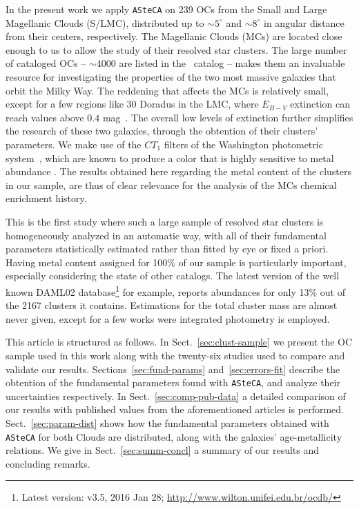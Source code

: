\documentclass{aa}
\begin{document}
In the present work we apply \texttt{ASteCA} on 239 OCs from the Small and Large
Magellanic Clouds (S/LMC), distributed up to ${\sim}5^{\circ}$ and ${\sim}8^
{\circ}$ in angular distance from their centers, respectively.
%
The Magellanic Clouds (MCs) are located close enough to us to allow the study of
their resolved star clusters. The large number of cataloged
OCs -- $\sim4000$ are listed in the~\cite{Bica_2008} catalog -- makes them an
invaluable resource for investigating the properties of the two most massive
galaxies that orbit the Milky Way.
%
The reddening that affects the MCs is relatively small,
except for a few regions like 30 Doradus in the LMC, where $E_{B-V}$
extinction can reach values above $0.4$ mag~\citep{Piatti_2015b}.
The overall low levels of extinction further simplifies the research of these
two galaxies, through the obtention of their clusters' parameters.
%
We make use of the $CT_1$ filters of the Washington photometric
system~\citep{Canterna_1976,Geisler_1996}, which are known to produce a color
that is highly sensitive to metal abundance \citep{Geisler_1999}.
The results obtained here regarding the metal content of the clusters in our
sample, are thus of clear relevance for the analysis of the MCs chemical
enrichment history.

This is the first study where such a large sample of resolved star clusters is
homogeneously analyzed in an automatic way, with all of their fundamental
parameters statistically estimated rather than fitted by eye or fixed a priori.
%
Having metal content assigned for 100\% of our sample is particularly
important, especially considering the state of other catalogs. The latest
version of the well known DAML02 database\footnote{Latest version: v3.5, 2016
Jan 28; \url{http://www.wilton.unifei.edu.br/ocdb/}}
\citep{Dias_2002} for example, reports abundances for only 13\% out of the 2167
clusters it contains. Estimations for the total cluster mass are almost never
given, except for a few works were integrated photometry is employed.

This article is structured as follows.
In Sect.~\ref{sec:clust-sample} we present the OC sample used in
this work along with the twenty-six studies used to compare and validate our
results.
Sections~\ref{sec:fund-params} and~\ref{sec:errors-fit} describe the obtention
of the fundamental parameters found with \texttt{ASteCA}, and analyze their
uncertainties respectively.
In Sect.~\ref{sec:comp-pub-data} a detailed comparison of our results with
published values from the aforementioned articles is performed.
Sect.~\ref{sec:param-dist} shows how the fundamental parameters obtained with
\texttt{ASteCA} for both Clouds are distributed, along with the galaxies'
age-metallicity relations.
We give in Sect.~\ref{sec:summ-concl} a summary of our results and concluding
remarks.
\end{document}
